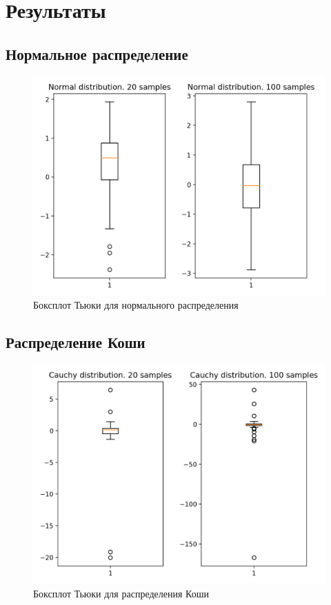 \section{Результаты}

\subsection{Нормальное распределение}
\begin{figure}[H]
	\begin{center}
		\includegraphics[scale=0.7]{fig/Normal distribution.png}
		\caption{Боксплот Тьюки для нормального распределения} 
		\label{pic:pic_name}
	\end{center}
\end{figure}


\subsection{Распределение Коши}
\begin{figure}[H]
	\begin{center}
		\includegraphics[scale=0.7]{fig/Cauchy distribution.png}
		\caption{Боксплот Тьюки для распределения Коши} 
		\label{pic:pic_name}
	\end{center}
\end{figure}



